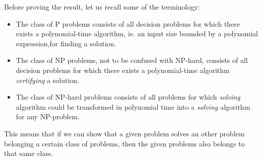 Before proving the result, let us recall some of the terminology: 

\begin{itemize}
	\item The class of P problems consists of all decision problems for which there exists a polynomial-time algorithm, ie. an input size bounded by a polynomial expression,for finding a solution.
	\item The class of NP problems, not to be confused with NP-hard, consists of all decision problems for which there exists a polynomial-time algorithm \emph{certifying} a solution.
	\item The class of NP-hard problems consists of all problems for which \emph{solving} algorithm could be transformed in polynomial time into a \emph{solving} algorithm for any NP-problem. 
\end{itemize}

This means that if we can show that a given problem solves an other problem belonging a certain class of problems, then the given problems also belongs to that same class. 

